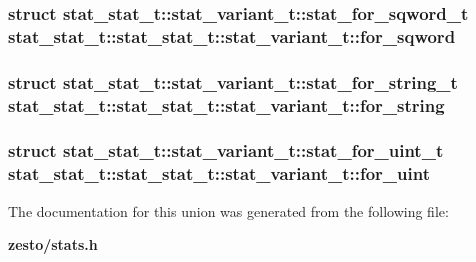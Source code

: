 \subsubsection[{for\_\-sqword}]{\setlength{\rightskip}{0pt plus 5cm}struct {\bf stat\_\-stat\_\-t::stat\_\-variant\_\-t::stat\_\-for\_\-sqword\_\-t}  stat\_\-stat\_\-t::stat\_\-stat\_\-t::stat\_\-variant\_\-t::for\_\-sqword}\label{unionstat__stat__t_1_1stat__variant__t_13d64976ee4eda8ed79d00684181a0b5}


\subsubsection[{for\_\-string}]{\setlength{\rightskip}{0pt plus 5cm}struct {\bf stat\_\-stat\_\-t::stat\_\-variant\_\-t::stat\_\-for\_\-string\_\-t}  stat\_\-stat\_\-t::stat\_\-stat\_\-t::stat\_\-variant\_\-t::for\_\-string}\label{unionstat__stat__t_1_1stat__variant__t_6beb9caf9cfa05368a2b2e887d674a3a}


\subsubsection[{for\_\-uint}]{\setlength{\rightskip}{0pt plus 5cm}struct {\bf stat\_\-stat\_\-t::stat\_\-variant\_\-t::stat\_\-for\_\-uint\_\-t}  stat\_\-stat\_\-t::stat\_\-stat\_\-t::stat\_\-variant\_\-t::for\_\-uint}\label{unionstat__stat__t_1_1stat__variant__t_c0cd7d76be8b7f09a4a009d5a5a2290c}




The documentation for this union was generated from the following file:\begin{CompactItemize}
\item 
{\bf zesto/stats.h}\end{CompactItemize}
